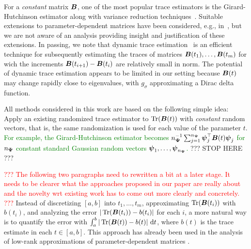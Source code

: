 For a \emph{constant} matrix $\boldsymbol{B}$, one of the most popular trace estimators is the Girard-Hutchinson estimator \cite{girard-1989-fast-montecarlo, hutchinson-1990-stochastic-estimator} along with variance reduction techniques~\cite{gambhir-2017-deflation-method, saibaba-2017-randomized-matrixfree, lin-2017-randomized-estimation, meyer-2021-hutch-optimal, persson-2022-improved-variants, chen-2023-krylovaware-stochastic, epperly-2024-xtrace-making}. Suitable extensions to parameter-dependent matrices have been considered, e.g., in~\cite{lin-2017-randomized-estimation,chen-2023-krylovaware-stochastic}, but we are not aware of an analysis providing insight and justification of these extensions. In passing, we note that dynamic trace estimation~\cite{dharangutte-2024-dynamic-trace,woodruff-2024-optimal-query} is an efficient technique for subsequently estimating the traces of matrices $\boldsymbol{B}(t_1), \dots, \boldsymbol{B}(t_m)$ for wich the increments $\boldsymbol{B}(t_{i+1}) - \boldsymbol{B}(t_i)$ are relatively small in norm. The potential of dynamic trace estimation appears to be limited in our setting because $\boldsymbol{B}(t)$ may change rapidly close to eigenvalues, with $g_{\sigma}$ approximating a Dirac delta function.

All methods considered in this work are based on the following simple idea: Apply an existing randomized trace estimator to $\operatorname{Tr}(\boldsymbol{B}(t))$ with \emph{constant} random vectors, that is, the same randomization is used for each value of the parameter $t$. \textcolor{green}{For example, the Girard-Hutchinson estimator becomes $n_{\boldsymbol{\Psi}}^{-1} \sum_{j=1}^{n_{\boldsymbol{\Psi}}} \boldsymbol{\psi}_j^{\top} \boldsymbol{B}(t) \boldsymbol{\psi}_j$ for $n_{\boldsymbol{\Psi}}$ constant standard Gaussian random vectors $\boldsymbol{\psi}_1, \dots, \boldsymbol{\psi}_{n_{\boldsymbol{\Psi}}}$.}
??? STOP HERE ???


\textcolor{red}{??? The following two paragraphs need to rewritten a bit at a later stage. It needs to be clearer what the approaches proposed in our paper are really about and the novelty wrt existing work has to come out more clearly and concretely. ???}
\color{black}
Instead of discretizing $[a, b]$ into $t_1, \ldots, t_m$, approximating $\operatorname{Tr}(\boldsymbol{B}(t_i))$ with $b(t_i)$, and analyzing the error $|\operatorname{Tr}(\boldsymbol{B}(t_i)) - b(t_i)|$ for each $i$, a more natural way is to quantify the error with $\int_{a}^{b} | \operatorname{Tr}(\boldsymbol{B}(t)) - b(t) |~\mathrm{d}t$, where $b(t)$ is the trace estimate in each $t \in [a, b]$. This approach has already been used in the analysis of low-rank approximations of parameter-dependent matrices \cite{kressner-2024-randomized-lowrank}.

